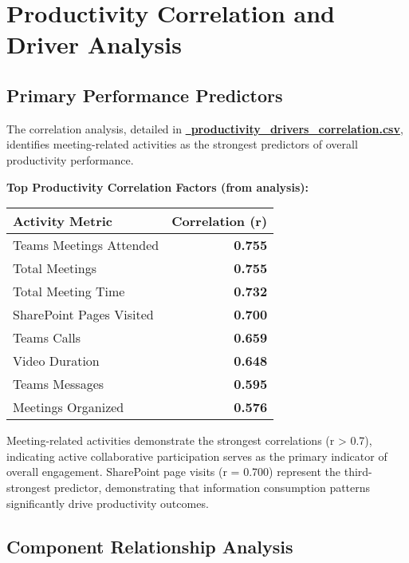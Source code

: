 \documentclass[12pt,a4paper]{article}
\begin{document}
\section{Productivity Correlation and Driver Analysis}

\subsection{Primary Performance Predictors}

The correlation analysis, detailed in \textcolor{successGreen}{\href{https://fixysaskihumorizijuv.supabase.co/storage/v1/object/public/research-files/dd2c8aa8-1c3d-4592-8ce2-9e275d102803-productivity_drivers_correlation.csv?download=}{{\normalsize\faCogs}\, \textbf{productivity\_drivers\_correlation.csv}}}, identifies meeting-related activities as the strongest predictors of overall productivity performance.

\begin{highlightbox}
\textbf{\faChartLine \quad Top Productivity Correlation Factors (from analysis):}
\begin{center}
\begin{tabular}{@{}lr@{}}
\textbf{\color{primaryBlue}Activity Metric} & \textbf{\color{accentBlue}Correlation (r)} \\
\midrule
Teams Meetings Attended & \textbf{0.755} \\
Total Meetings & \textbf{0.755} \\
Total Meeting Time & \textbf{0.732} \\
SharePoint Pages Visited & \textbf{0.700} \\
Teams Calls & \textbf{0.659} \\
Video Duration & \textbf{0.648} \\
Teams Messages & \textbf{0.595} \\
Meetings Organized & \textbf{0.576} \\
\end{tabular}
\end{center}
\end{highlightbox}

Meeting-related activities demonstrate the strongest correlations (r > 0.7), indicating active collaborative participation serves as the primary indicator of overall engagement. SharePoint page visits (r = 0.700) represent the third-strongest predictor, demonstrating that information consumption patterns significantly drive productivity outcomes.

\subsection{Component Relationship Analysis}
\end{document}

